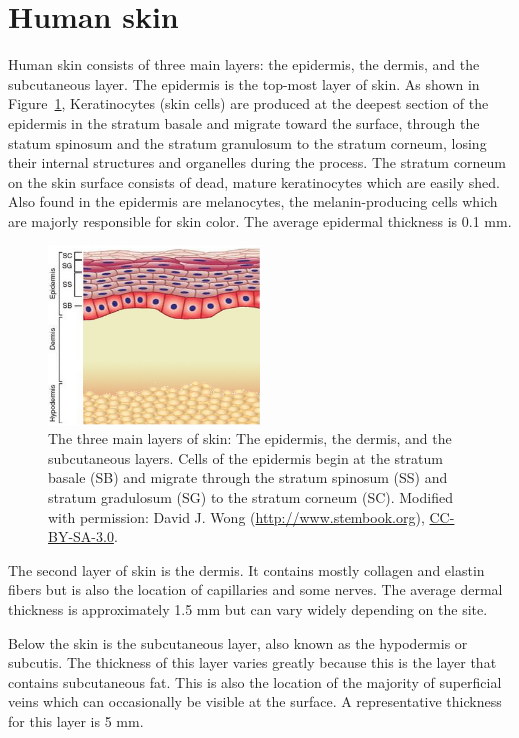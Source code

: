 \section{Human skin}
\label{sec:skin}
Human skin consists of three main layers: the epidermis, the dermis, and the subcutaneous layer.\cite{Fodor2011a} The epidermis is the top-most layer of skin. As shown in Figure~\ref{fig:intro-skin_layers}, Keratinocytes (skin cells) are produced at the deepest section of the epidermis in the stratum basale and migrate toward the surface, through the statum spinosum and the stratum granulosum to the stratum corneum, losing their internal structures and organelles during the process. The stratum corneum on the skin surface consists of dead, mature keratinocytes which are easily shed. Also found in the epidermis are melanocytes, the melanin-producing cells which are majorly responsible for skin color. The average epidermal thickness is 0.1 mm.\cite{Yang2009}

\begin{figure}
	\centering \includegraphics[width=0.5\textwidth]{figures/intro-skin_layers.jpg}
	\caption[Cross-section of layers of human skin]{\label{fig:intro-skin_layers}The three main layers of skin: The epidermis, the dermis, and the subcutaneous layers. Cells of the epidermis begin at the stratum basale (SB) and migrate through the stratum spinosum (SS) and stratum gradulosum (SG) to the stratum corneum (SC). Modified with permission: \textcopyright David J. Wong (\url{http://www.stembook.org}), \href{http://creativecommons.org/licenses/by-sa/3.0/}{CC-BY-SA-3.0}.\cite{Wong2009}}
\end{figure}

The second layer of skin is the dermis. It contains mostly collagen and elastin fibers but is also the location of capillaries and some nerves. The average dermal thickness is approximately 1.5 mm but can vary widely depending on the site.

Below the skin is the subcutaneous layer, also known as the hypodermis or subcutis. The thickness of this layer varies greatly because this is the layer that contains subcutaneous fat. This is also the location of the majority of superficial veins which can occasionally be visible at the surface. A representative thickness for this layer is 5 mm.

